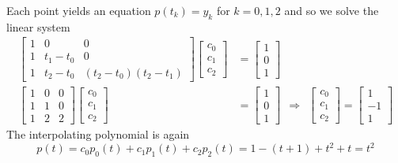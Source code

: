 \begin{example}
Each point yields an equation $p(t_k) = y_k$ for $k=0,1,2$ and so we solve the linear system
\begin{align*}
\left[ \begin{array}{ccc} 1 & 0 & 0 \\ 1 & t_1 - t_0 & 0 \\ 1 & t_2 - t_0 & (t_2-t_0)(t_2-t_1) \end{array} \right]
\begin{bmatrix} c_0 \\ c_1 \\ c_2 \end{bmatrix}
&=
\begin{bmatrix} 1 \\ 0 \\ 1 \end{bmatrix}
\\
\left[ \begin{array}{rrr} 1 & 0 & 0 \\ 1 & 1 & 0 \\ 1 & 2 & 2 \end{array} \right]
\begin{bmatrix} c_0 \\ c_1 \\ c_2 \end{bmatrix}
&=
\begin{bmatrix} 1 \\ 0 \\ 1 \end{bmatrix}
\ \
\Rightarrow
\ \
\begin{bmatrix} c_0 \\ c_1 \\ c_2 \end{bmatrix} = \left[ \begin{array}{r} 1 \\ -1 \\ 1 \end{array} \right]
\end{align*}
The interpolating polynomial is again
$$
p(t) = c_0 p_0(t) + c_1 p_1(t) + c_2 p_2(t) = 1 - (t+1) + t^2 + t = t^2
$$
\end{example}
